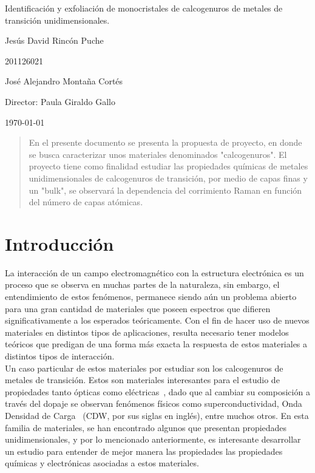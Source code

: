 \documentclass{article}
\begin{document}
\begin{center}
\Huge
Identificación y exfoliación de monocristales de calcogenuros de metales de transición unidimensionales.

\vspace{3mm}
\Large Jesús David Rincón Puche

\large
201126021

\Large José Alejandro Montaña Cortés
\large 


\vspace{2mm}
\Large
Director: Paula Giraldo Gallo\\


\normalsize
\vspace{2mm}

\today
\end{center}

\begin{abstract}
 En el presente documento se presenta la propuesta de proyecto, en donde se busca caracterizar unos materiales denominados "calcogenuros". El proyecto tiene como finalidad estudiar las propiedades químicas de metales unidimensionales de calcogenuros de transición, por medio de capas finas y un "bulk", se observará la dependencia del corrimiento Raman en función del número de capas atómicas.
\end{abstract}

\normalsize
\section{Introducción}

La interacción de un campo electromagnético con la estructura electrónica es un proceso que se observa en muchas partes de la naturaleza, sin embargo, el entendimiento de estos fenómenos, permanece siendo aún un problema abierto para una gran cantidad de materiales que poseen espectros que difieren significativamente a los esperados teóricamente. Con el fin de hacer uso de nuevos materiales en distintos tipos de aplicaciones, resulta necesario tener modelos teóricos que predigan de una forma más exacta la respuesta de estos materiales a distintos tipos de interacción.\\

Un caso particular de estos materiales por estudiar son los calcogenuros de metales de transición. Estos son materiales interesantes para el estudio de propiedades tanto ópticas como eléctricas~\cite{dical}, dado que al cambiar su composición a través del dopaje se observan fenómenos físicos como superconductividad, Onda Densidad de Carga~\cite{CDW} (CDW, por sus siglas en inglés), entre muchos otros. En esta familia de materiales, se han encontrado algunos que presentan propiedades unidimensionales, y por lo mencionado anteriormente, es interesante desarrollar un estudio para entender de mejor manera las propiedades las propiedades químicas y electrónicas asociadas a estos materiales.\\
\end{document}
